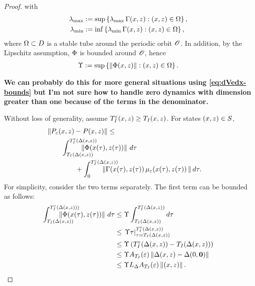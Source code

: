 \documentclass[twocolumn]{article}
\begin{document}
\begin{proof}
  with
  \begin{align}
    \nonumber
    \lambda_{\mathrm{max}} &:= \sup \left\{\operatorname*{\lambda_{\mathrm{max}}}\Gamma(x, z) : (x, z) \in \Omega \right\},\\
    \lambda_{\mathrm{min}} &:= \inf \left\{\operatorname*{\lambda_{\mathrm{min}}}\Gamma(x, z) : (x, z) \in \Omega \right\},
  \end{align}
  where $\Omega \subset D$ is a stable tube around the periodic orbit ${\mathscr O}$.
  In addition, by the Lipschitz assumption, $\Phi$ is bounded around ${\mathscr O}$, hence
  \begin{align}
    \Upsilon := \sup \left\{ \left\| \Phi(x, z) \right\| : (x, z) \in \Omega \right\}.
  \end{align}
  
  
  {\bf We can probably do this for more general situations using \eqref{eq:dVedx-bounds} but I'm not sure how to handle zero dynamics with dimension greater than one because of the terms in the denominator.}

  Without loss of generality, assume $T_{I}^{\varepsilon}(x, z) \geq T_{I}(x, z)$.
  For states $(x, z) \in S$,
  \begin{align}
    \label{eq:flow-bound-comp}
    \lefteqn{\left\| \Pe\argsxz - \P\argsxz \right\| \leq}\\
    \nonumber
    & \hspace{2em} \int_{\TIDelta}^{\TIeDelta} \hspace{-2.5em} \left\| \bigF\argsxztau \right\| \, d\tau\\
    \nonumber
    & \hspace{4em} \mbox{} + \int_{0}^{\TIeDelta} \hspace{-2.5em} \left\| \bigG\argsxztau \, \mueps\argsxztau \, \right\| d\tau.
  \end{align}
  For simplicity, consider the two terms separately.
  The first term can be bounded as follows:
  \begin{align}
    \nonumber
    \int_{\TIDelta}^{\TIeDelta)} \! \hspace{-3em} \left\| \bigF\argsxztau \right\| \, d\tau
    &\leq \supF \int_{\TIDelta}^{\TIeDelta} d\tau\\
    \nonumber
    &\leq \left.\supF \tau\right|_{\tau=\TIDelta}^{\TIeDelta}\\
    \nonumber
    &\leq \supF \left(\TIeDelta - \TIDelta\right)\\
    \nonumber
    &\leq \supF \ATIe \left\| \Deltaxz - \Delta\argszero \right\|\\
    \label{eq:F-bound}
    &\leq \supF \LDelta \ATIe \nzdxz.
  \end{align}



\end{proof}
\end{document}

